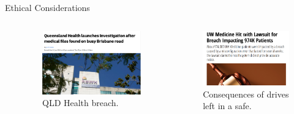 \documentclass[aspectratio=169, 11pt]{beamer} %
\begin{document}
\begin{frame}{Ethical Considerations}
\begin{columns}[t]
\begin{column}{.35\textwidth}
\begin{itemize}
    
\end{itemize}
\vfill
\end{column}
\begin{column}{.3\textwidth}
\begin{figure}
    \centering
    \vspace{-8mm}
    \includegraphics[width=\linewidth]{figures/qld-breach.png}
    \caption{QLD Health breach. \parencite{Bavas2019-xc}}
\end{figure}
\end{column}
\begin{column}{.3\textwidth}

\begin{figure}
    \centering
    \vspace{-8mm}
    \includegraphics[width=\linewidth]{figures/uw.png}
    \caption{Consequences of drives left in a safe. \parencite{Davis2020-jr}}
\end{figure}

\end{column}
\end{columns}



\end{frame}
\end{document}
